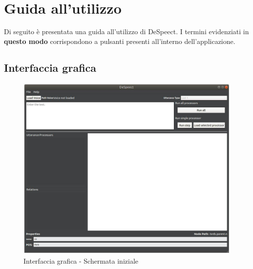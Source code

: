 \documentclass[openany,12pt,a4paper]{report}
\begin{document}
	\chapter{Guida all'utilizzo}
	Di seguito è presentata una guida all'utilizzo di DeSpeect.
	I termini evidenziati in \textbf{questo modo} corrispondono a pulsanti presenti all'interno dell'applicazione.
	
	\section{Interfaccia grafica}
	
	\begin{figure}[H]
		
		\centering
		
		\includegraphics[width=\textwidth]{./img/avvio}
		
		\caption{Interfaccia grafica - Schermata iniziale}
	
	\end{figure}
\end{document}
